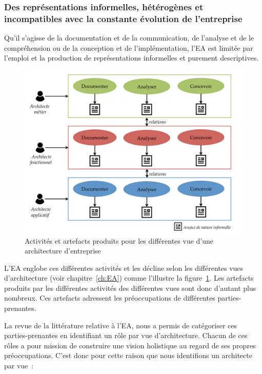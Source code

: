 \subsubsection{Des représentations informelles, hétérogènes et incompatibles avec
la constante évolution de l'entreprise}
    \label{sec:roles}

Qu'il s'agisse de la documentation et de la communication, de l'analyse et de
le compréhension ou de la conception et de l'implémentation, l'EA est limitée
par l'emploi et la production de représentations informelles et purement
descriptives.

\begin{figure}[!ht]
     \begin{center}
    \includegraphics[width=1\textwidth]{figures/4_demarche/pratique_courante_ea.pdf}
     \end{center}
     \caption{Activités et artefacts produits pour les différentes vue d'une architecture d'entreprise}
     \label{fig:limites_ea}
\end{figure}

L'EA englobe ces différentes activités et les décline selon les différentes
vues d'architecture (voir chapitre~\ref{ch:EA}) comme l'illustre la
figure~\ref{fig:limites_ea}. Les artefacts produits par les différentes
activités des différentes vues sont donc d'autant plus nombreux. Ces artefacts
adressent les préoccupations de différentes parties-prenantes.

La revue de la littérature relative à l'EA, nous a permis de catégoriser ces
parties-prenantes en identifiant un rôle par vue d'architecture. Chacun de ces
rôles a pour mission de construire une vision holistique au regard de ses
propres préoccupations. C'est donc pour cette raison que nous identifions un
architecte par vue~:

